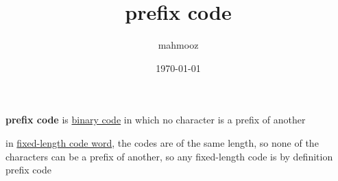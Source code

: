 \documentclass[11pt]{article}
\author{mahmooz}
\date{\today}
\title{prefix code}
\begin{document}
\maketitle
\tableofcontents

\begin{definition}
\textbf{prefix code} is \href{20230119160930-binary_coding.org}{binary code} in which no character is a prefix of another\\[0pt]
\end{definition}
\begin{note}
in \href{20230119170007-fixed_length_code_word.org}{fixed-length code word}, the codes are of the same length, so none of the characters can be a prefix of another, so any fixed-length code is by definition prefix code\\[0pt]
\end{note}
\end{document}
